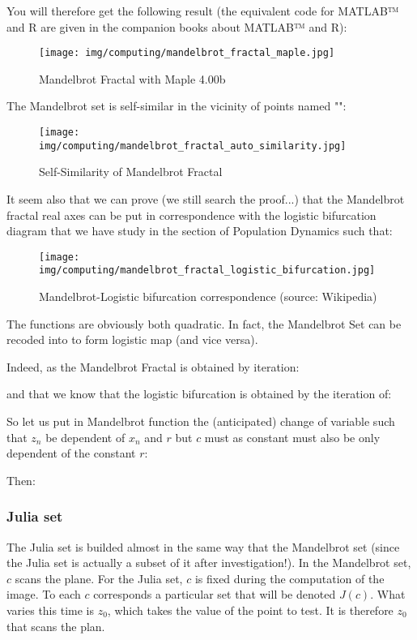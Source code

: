 	You will therefore get the following result (the equivalent code for MATLAB™ and R are given in the companion books about MATLAB™ and R):
	\begin{figure}[H]
		\centering
		\texttt{[image: img/computing/mandelbrot\_fractal\_maple.jpg]}
		\caption{Mandelbrot Fractal with Maple 4.00b}
	\end{figure}
	The Mandelbrot set is self-similar in the vicinity of points named "":
	\begin{figure}[H]
		\centering
		\texttt{[image: img/computing/mandelbrot\_fractal\_auto\_similarity.jpg]}
		\caption{Self-Similarity of Mandelbrot Fractal}
	\end{figure}
	It seem also that we can prove (we still search the proof...) that the Mandelbrot fractal real axes can be put in correspondence with the logistic bifurcation diagram that we have study in the section of Population Dynamics such that:
	\begin{figure}[H]
		\centering
		\texttt{[image: img/computing/mandelbrot\_fractal\_logistic\_bifurcation.jpg]}
		\caption[Mandelbrot-Logistic bifurcation correspondence]{Mandelbrot-Logistic bifurcation correspondence (source: Wikipedia)}
	\end{figure}
	The functions are obviously both quadratic. In fact, the Mandelbrot Set can be recoded into to form logistic map (and vice versa).
	
	Indeed, as the Mandelbrot Fractal is obtained by iteration:
	
	and that we know that the logistic bifurcation is obtained by the iteration of:
	
	So let us put in Mandelbrot function the (anticipated) change of variable such that $z_n$ be dependent of $x_n$ and $r$ but $c$ must as constant must also be only dependent of the constant $r$:
	
	Then:
	
	
	\subsubsection{Julia set}
	The Julia set is builded almost in the same way that the Mandelbrot set (since the Julia set is actually a subset of it after investigation!). In the Mandelbrot set, $c$ scans the plane. For the Julia set, $c$ is fixed during the computation of the image. To each $c$ corresponds a particular set that will be denoted $J(c)$. What varies this time is $z_0$, which takes the value of the point to test. It is therefore $z_0$ that scans the plan.
	
